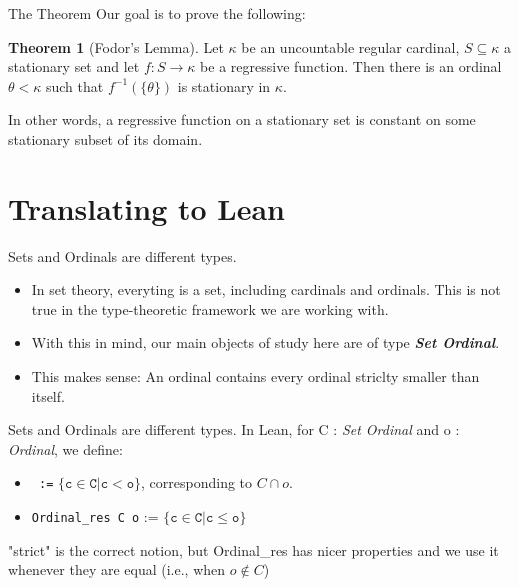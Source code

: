 \documentclass{beamer}
\theoremstyle{definition}
\newtheorem{thm}[subsection]{Theorem}
\begin{document}
\begin{frame}{The Theorem}
    Our goal is to prove the following:
    \begin{thm}[Fodor's Lemma]
       Let $\kappa$ be an uncountable regular cardinal, $S\subseteq\kappa$ a stationary set and let $f:S\rightarrow \kappa$ be a regressive function. Then there is an ordinal $\theta <\kappa$ such that $f^{-1}(\{\theta\})$ is stationary in $\kappa$.
    \end{thm}\pause
    In other words, a regressive function on a stationary set is constant on some stationary subset of its domain.
\end{frame}

\section{Translating to Lean}

\begin{frame}{Sets and Ordinals are different types.}
    \begin{itemize}
        \item In set theory, everyting is a set, including cardinals and ordinals. This is not true in the type-theoretic framework we are working with. \pause
        \item With this in mind, our main objects of study here are of type \textit{\textbf{Set Ordinal}}. \pause
        \item This makes sense: An ordinal contains every ordinal striclty smaller than itself.
    \end{itemize}
\end{frame}

\begin{frame}{Sets and Ordinals are different types.}
    In Lean, for C : \textit{Set Ordinal} and o : \textit{Ordinal}, we define:
    \begin{itemize}
        \item \texttt{ :=} $\mathtt{\{c\in C | c < o\}}$, corresponding to $C\cap o.$ \pause
        \item \texttt{Ordinal\_res C o} := $\mathtt{\{c\in C | c \leq o\}}$ \pause
    \end{itemize}
    "strict" is the correct notion, but Ordinal\_res has nicer properties and we use it whenever they are equal (i.e., when $o\notin C$)
\end{frame}
\end{document}
